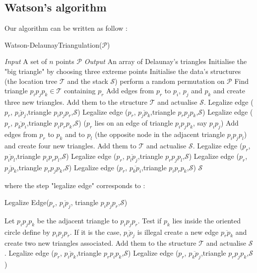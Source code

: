 \subsection*{Watson's algorithm}
Our algorithm can be written as follow :  
\begin{algorithm}
\caption{Watson-DelaunayTriangulation($\mathcal{P}$)}\label{Delaunay}
\begin{algorithmic}[1]
\State \textit{Input} A set of $n$ points $\mathcal{P}$
\State \textit{Output} An array of Delaunay's triangles
\State Initialise the "big triangle" by choosing three extreme points 
\State Initialise the data's structures (the location tree $\mathcal{T}$ and the stack $\mathcal{S}$)
\State perform a random permutation on $\mathcal{P}$
\State Find triangle $p_ip_jp_k \in \mathcal{T}$ containing $p_r$
\State Add edges from $p_r$ to $p_i$, $p_j$ and $p_k$ and create three new triangles. Add them to the structure $\mathcal{T}$ and actualise $\mathcal{S}$.
\State Legalize edge ($p_r$, $\overline{p_ip_j}$,triangle $p_ip_jp_r$,$\mathcal{S}$)
\State Legalize edge ($p_r$, $\overline{p_jp_k}$,triangle $p_rp_jp_k$,$\mathcal{S}$)
\State Legalize edge ($p_r$, $\overline{p_kp_i}$,triangle $p_ip_rp_k$,$\mathcal{S}$)
\Else ($p_r$ lies on an edge of triangle $p_ip_jp_k$, say $p_ip_j$)
\State Add edges from $p_r$ to $p_k$ and to $p_l$ (the opposite node in the adjacent triangle $p_ip_jp_l$) and create four new triangles. Add them to $\mathcal{T}$ and actualise $\mathcal{S}$.
\State Legalize edge ($p_r$, $\overline{p_ip_l}$,triangle $p_ip_rp_l$,$\mathcal{S}$)
\State Legalize edge ($p_r$, $\overline{p_lp_j}$,triangle $p_rp_jp_l$,$\mathcal{S}$)
\State Legalize edge ($p_r$, $\overline{p_jp_k}$,triangle $p_rp_jp_k$,$\mathcal{S}$)
\State Legalize edge ($p_r$, $\overline{p_kp_i}$,triangle $p_ip_rp_k$,$\mathcal{S}$)
\EndIf
\EndFor
\Return $\mathcal{S}$
\end{algorithmic}
\end{algorithm}
where the step "legalize edge" corresponds to : 
\begin{algorithm}
\caption{Legalize Edge($p_r$, $\overline{p_ip_j}$, triangle $p_ip_jp_r$,$\mathcal{S}$)} \label{legalizeEdge}
\begin{algorithmic}[1]
\State Let $p_ip_jp_k$ be the adjacent triangle to $p_ip_jp_r$. Test if $p_k$ lies inside the oriented circle define by $p_ip_jp_r$. If it is the case, $\overline{p_ip_j}$ is illegal 
\State create a new edge $\overline{p_rp_k}$ and create two new triangles associated. Add them to the structure $\mathcal{T}$ and actualise $\mathcal{S}$.
\State Legalize edge ($p_r$, $\overline{p_ip_k}$,triangle $p_rp_ip_k$,$\mathcal{S}$)
\State Legalize edge ($p_r$, $\overline{p_kp_j}$,triangle $p_rp_jp_k$,$\mathcal{S}$)
\EndIf
\end{algorithmic}
\end{algorithm}

